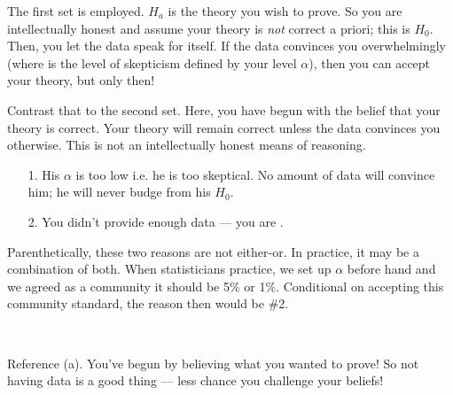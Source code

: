 \documentclass[12pt]{article}
\begin{document}
\begin{enumerate}



The first set is employed. $H_a$ is the theory you wish to prove. So you are intellectually honest and assume your theory is \textit{not} correct a priori; this is $H_0$. Then, you let the data speak for itself. If the data convinces you overwhelmingly (where  is the level of skepticism defined by your level $\alpha$), then you can accept your theory, but only then! 

Contrast that to the second set. Here, you have begun with the belief that your theory is correct. Your theory will remain correct unless the data convinces you otherwise. This is not an intellectually honest means of reasoning.

 

\begin{enumerate}
\item[1.] His $\alpha$ is too low i.e. he is too skeptical. No amount of data will convince him; he will never budge from his $H_0$.
\item[2.] You didn't provide enough data --- you are .
\end{enumerate}

Parenthetically, these two reasons are not either-or. In practice, it may be a combination of both. When statisticians practice, we set up $\alpha$ before hand and we agreed as a community it should be 5\% or 1\%. Conditional on accepting this community standard, the reason then would be \#2.

~

Reference (a). You've begun by believing what you wanted to prove! So not having data is a good thing --- less chance you challenge your beliefs!

\end{enumerate}
\end{document}

